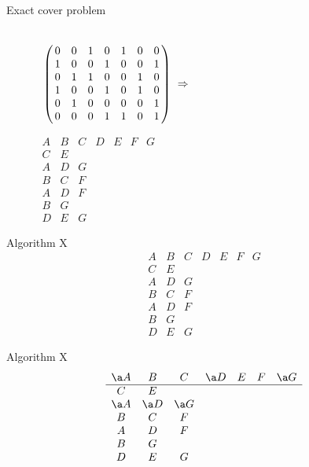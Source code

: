 \documentclass[xcolor=svgnames]{beamer}
\begin{document}
%
\begin{frame}{Exact cover problem}
\Large\boldmath
  \begin{figure}[!htb]
    \hskip-17mm\begin{minipage}{.7\textwidth}
      \centering
      $\bordermatrix{
  \strut&&&&&&&\cr
  &0&0&1&0&1&0&0\cr
  &1&0&0&1&0&0&1\cr
  &0&1&1&0&0&1&0\cr
  &1&0&0&1&0&1&0\cr
  &0&1&0&0&0&0&1\cr
  &0&0&0&1&1&0&1}\ \Rightarrow$
    \end{minipage}%
    \begin{minipage}{.3\textwidth}
      \centering
  $
  \begin{array}{ccccccc}
    A & B & C & D & E & F & G\\
    \hline
    C & E &&&&&\\
    A & D & G &&&&\\
    B & C & F &&&&\\
    A & D & F &&&&\\
    B & G &&&&&\\
    D & E & G &&&&
  \end{array}
  $
    \end{minipage}
\end{figure}
\end{frame}

\renewcommand\arraystretch{1.3}
%
\begin{frame}{Algorithm X}
\Large\boldmath
  $$
  \begin{array}{ccccccc}
    A & B & C & D & E & F & G\\
    \hline
    C & E &&&&&\\
    A & D & G &&&&\\
    B & C & F &&&&\\
    A & D & F &&&&\\
    B & G &&&&&\\
    D & E & G &&&&
  \end{array}
  $$
\end{frame}

%
\begin{frame}{Algorithm X}
\Large\boldmath
  $$
  \begin{array}{ccccccc}
    \a A & B & C & \a D & E & F & \a G\\
    \hline
    C & E &&&&&\\
    \a A & \a D & \a G &&&&\\
    B & C & F &&&&\\
    A & D & F &&&&\\
    B & G &&&&&\\
    D & E & G &&&&
  \end{array}
  $$
\end{frame}
\end{document}
